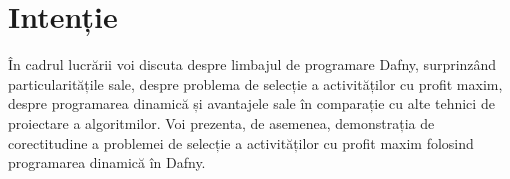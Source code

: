 \chapter*{Intenție} 

În cadrul lucrării voi discuta despre limbajul de programare Dafny, surprinzând particularitățile sale, despre problema de selecție a activităților cu profit maxim, despre programarea dinamică și avantajele sale în comparație cu alte tehnici de proiectare a algoritmilor. 
Voi prezenta, de asemenea, demonstrația de corectitudine a problemei de selecție a activităților cu profit maxim folosind programarea dinamică în Dafny.  